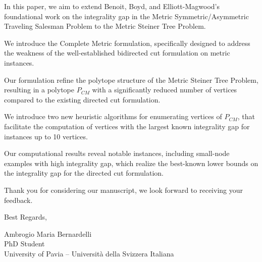 \documentclass{article}
\begin{document}
In this paper, we aim to extend Benoit, Boyd, and Elliott-Magwood’s foundational work on the integrality gap in the Metric Symmetric/Asymmetric Traveling Salesman Problem to the Metric Steiner Tree Problem. 
%

We introduce the Complete Metric formulation, specifically designed to address the weakness of the well-established bidirected cut formulation on metric instances.

Our formulation refine the polytope structure of the Metric Steiner Tree Problem, resulting in a polytope $ P_{CM} $ with a significantly reduced number of vertices compared to the existing directed cut formulation.

We introduce two new heuristic algorithms for enumerating vertices of $P_{CM}$, that facilitate the computation of vertices with the largest known integrality gap for instances up to 10 vertices.


Our computational results reveal notable instances, including small-node examples with high integrality gap, which realize the best-known lower bounds on the integrality gap for the directed cut formulation.


\bigskip %

Thank you for considering our manuscript, we look forward to receiving your feedback.

Best Regards,

\vspace{\fill} %
Ambrogio Maria Bernardelli\\
PhD Student\\
University of Pavia -- Università della Svizzera Italiana
\end{document}
